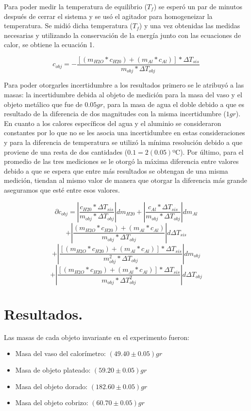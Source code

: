 \documentclass[a4paper]{article}
\begin{document}
Para poder medir la temperatura de equilibrio ($T_{f}$) se esperó un par de minutos después de cerrar el sistema y se usó el agitador para homogeneizar la temperatura. Se midió dicha temperatura ($T_{f}$) y una vez  obtenidas las medidas necesarias y utilizando la conservación de la energía junto con las ecuaciones de calor, se obtiene la ecuación 1.

\begin{equation}\label{ec.2}
    c_{obj}=-\frac{[(m_{H2O}*c_{H20})+(m_{Al}* c_{Al})]* \Delta T_{sis}}{m_{obj}* \Delta T_{obj}}
\end{equation}

Para poder otorgarles incertidumbre a los resultados primero se le atribuyó a las masas: la incertidumbre debida al objeto de medición para la masa del vaso y el objeto metálico que fue de $0.05 gr$, para la masa de agua el doble debido a que es resultado de la diferencia de dos magnitudes con la misma incertidumbre ($1gr$). En cuanto a los calores específicos del agua y el aluminio se consideraron constantes por lo que no se les asocia una incertidumbre en estas consideraciones y para la diferencia de temperatura se utilizó la mínima resolución debido a que proviene de una resta de dos cantidades ($0.1 = 2(0.05)$ºC). Por último, para el promedio de las tres mediciones se le otorgó la máxima diferencia entre valores debido a que se espera que entre más resultados se obtengan de una misma medición, tiendan al mismo valor de manera que otorgar la diferencia más grande aseguramos que esté entre esos valores.

$$\partial c_{obj} = \left|\frac{c_{H20}*\Delta T_{sis}}{m_{obj} * \Delta T_{obj}} \right|dm_{H20} + \left|\frac{c_{Al}*\Delta T_{sis}}{m_{obj} * \Delta T_{obj}} \right|dm_{Al}$$
$$+\left| \frac{(m_{H2O}*c_{H20})+(m_{Al}* c_{Al})}{m_{obj}* \Delta T_{obj}}\right|d\Delta T_{sis}$$
$$+ \left| \frac{[(m_{H2O}*c_{H20})+(m_{Al}* c_{Al})]* \Delta T_{sis}}{m^2_{obj}* \Delta T_{obj}}\right|dm_{obj}$$
$$+ \left|  \frac{[(m_{H2O}*c_{H20})+(m_{Al}* c_{Al})]* \Delta T_{sis}}{m_{obj}* \Delta T^2_{obj}} \right|d\Delta T_{obj}$$


\section*{Resultados.}
Las masas de cada objeto invariante en el experimento fueron:
\begin{itemize}
    \item Masa del vaso del calorímetro: $(49.40\pm0.05)gr $
    \item Masa de objeto plateado: $(59.20\pm0.05)gr $
    \item Masa del objeto dorado: $(182.60\pm0.05)gr $
    \item Masa del objeto cobrizo: $(60.70\pm0.05)gr $
\end{itemize}
\end{document}
